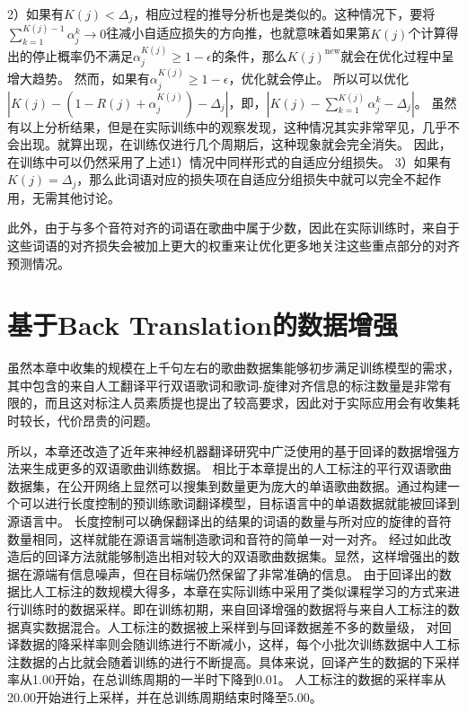 2）如果有$K(j) < \Delta_j$，相应过程的推导分析也是类似的。这种情况下，要将$\sum_{k=1}^{K(j)-1}\alpha_j^k\rightarrow0$往减小自适应损失的方向推，也就意味着如果第$K(j)$个计算得出的停止概率仍不满足$\alpha_j^{K(j)} \geq 1-\epsilon$的条件，那么$K(j)^{\text{new}}$就会在优化过程中呈增大趋势。
然而，如果有$\alpha_j^{K(j)} \geq 1 - \epsilon$，优化就会停止。
所以可以优化$\left| K(j) - \left(1 - R(j) + \alpha_j^{K(j)}\right) - \Delta_j \right|$，即，$\left| K(j) -\sum_{k=1}^{K(j)} \alpha_j^{k} - \Delta_j \right|$。
虽然有以上分析结果，但是在实际训练中的观察发现，这种情况其实非常罕见，几乎不会出现。就算出现，在训练仅进行几个周期后，这种现象就会完全消失。
因此，在训练中可以仍然采用了上述1）情况中同样形式的自适应分组损失。
3）如果有$K(j) = \Delta_j$，那么此词语对应的损失项在自适应分组损失中就可以完全不起作用，无需其他讨论。

此外，由于与多个音符对齐的词语在歌曲中属于少数，因此在实际训练时，来自于这些词语的对齐损失会被加上更大的权重来让优化更多地关注这些重点部分的对齐预测情况。
\section{基于Back Translation的数据增强}
\label{sec:bta}
虽然本章中收集的规模在上千句左右的歌曲数据集能够初步满足训练模型的需求，其中包含的来自人工翻译平行双语歌词和歌词-旋律对齐信息的标注数量是非常有限的，而且这对标注人员素质提也提出了较高要求，因此对于实际应用会有收集耗时较长，代价昂贵的问题。

所以，本章还改造了近年来神经机器翻译研究中广泛使用的基于回译的数据增强方法\citep{backtrans}来生成更多的双语歌曲训练数据。
相比于本章提出的人工标注的平行双语歌曲数据集，在公开网络上显然可以搜集到数量更为庞大的单语歌曲数据。通过构建一个可以进行长度控制的预训练歌词翻译模型，目标语言中的单语数据就能被回译到源语言中。
长度控制可以确保翻译出的结果的词语的数量与所对应的旋律的音符数量相同，这样就能在源语言端制造歌词和音符的简单一对一对齐。
经过如此改造后的回译方法就能够制造出相对较大的双语歌曲数据集。显然，这样增强出的数据在源端有信息噪声，但在目标端仍然保留了非常准确的信息。
由于回译出的数据比人工标注的数规模大得多，本章在实际训练中采用了类似课程学习的方式来进行训练时的数据采样。即在训练初期，来自回译增强的数据将与来自人工标注的数据真实数据混合。人工标注的数据被上采样到与回译数据差不多的数量级，
对回译数据的降采样率则会随训练进行不断减小，这样，每个小批次训练数据中人工标注数据的占比就会随着训练的进行不断提高。具体来说，回译产生的数据的下采样率从1.00开始，在总训练周期的一半时下降到0.01。
人工标注的数据的采样率从20.00开始进行上采样，并在总训练周期结束时降至5.00。


